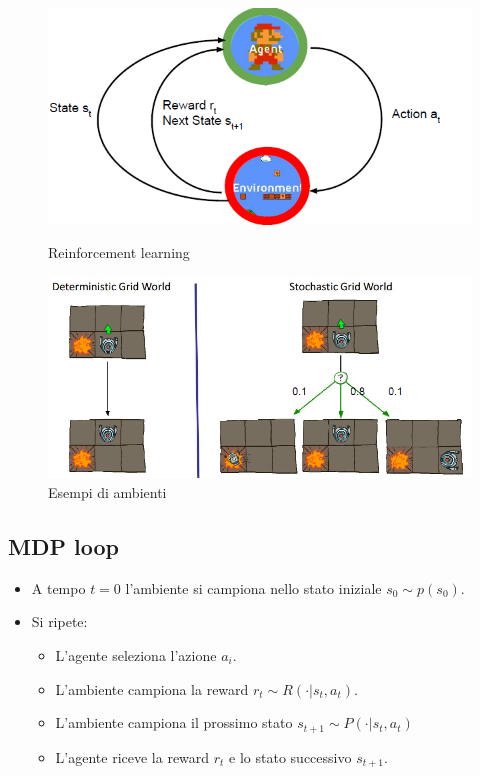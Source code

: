 \begin{figure}
	\centering
	\begin{minipage}{.5\textwidth}
		\centering
		\includegraphics[width=0.7\linewidth]{imgs/chapter13/img0}
		\caption{Reinforcement learning}
		\label{fig:chapter13-00}
	\end{minipage}%
	\begin{minipage}{.5\textwidth}
		\centering
		\includegraphics[width=1\linewidth]{imgs/chapter13/img1}
		\caption{Esempi di ambienti}
		\label{fig:chapter13-01}
	\end{minipage}
\end{figure}

\subsection{MDP loop}
\begin{itemize}
	\item A tempo $t=0$ l'ambiente si campiona nello stato iniziale $s_0\sim p(s_0)$.
	\item Si ripete:
	\begin{itemize}
		\item L'agente seleziona l'azione $a_i$.
		\item L'ambiente campiona la reward $r_t\sim R(\cdot|s_t, a_t)$.
		\item L'ambiente campiona il prossimo stato $s_{t+1}\sim P(\cdot|s_t, a_t)$
		\item L'agente riceve la reward $r_t$ e lo stato successivo $s_{t+1}$.
	\end{itemize}
\end{itemize}

